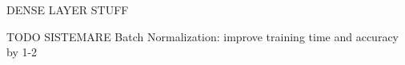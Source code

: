 \documentclass[conference,compsoc,11pt]{IEEEtran}
\begin{document}
DENSE LAYER STUFF


TODO SISTEMARE Batch Normalization: improve training time and accuracy by 1-2%



\end{document}

